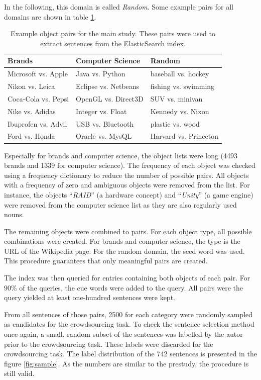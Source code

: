 In the following, this domain is called \emph{Random}. Some example pairs for all domains are shown in table \ref{tbl:exp_pairs}.
\begin{table}[h]
\centering
\caption{Example object pairs for the main study. These pairs were used to extract sentences from the ElasticSearch index.}
\label{tbl:exp_pairs}

\begin{tabularx}{\textwidth}{XXX}
\toprule
Brands & Computer Science & Random \\
\midrule
Microsoft vs. Apple & Java vs. Python & baseball vs. hockey \\
Nikon vs. Leica & Eclipse vs. Netbeans & fishing vs. swimming\\
Coca-Cola vs. Pepsi & OpenGL vs. Direct3D & SUV vs. minivan\\
Nike vs. Adidas & Integer vs. Float & Kennedy vs. Nixon\\
Ibuprofen vs. Advil & USB vs. Bluetooth & plastic vs. wood\\
Ford vs. Honda & Oracle vs. MysQL & Harvard vs. Princeton\\

\bottomrule

\end{tabularx}

\end{table}

Especially for brands and computer science, the object lists were long (4493 brands and 1339 for computer science). The frequency of each object was checked using a frequency dictionary to reduce the number of possible pairs. All objects with a frequency of zero and ambiguous objects were removed from the list. For instance, the objects \enquote{\emph{RAID}} (a hardware concept) and \enquote{\emph{Unity}}  (a game engine) were removed from the computer science list as they are also regularly used nouns.

The remaining objects were combined to pairs. For each object type, all possible combinations were created. For brands and computer science, the type is the URL of the Wikipedia page. For the random domain, the seed word was used. This procedure guarantees that only meaningful pairs are created.

The index was then queried for entries containing both objects of each pair. For 90\% of the queries, the cue words were added to the query. All pairs were the query yielded at least one-hundred sentences were kept.

From all sentences of those pairs, 2500 for each category were randomly sampled as candidates for the crowdsourcing task. To check the sentence selection method once again, a small, random subset of the sentences was labelled by the autor prior to the crowdsourcing task. These labels were discarded for the crowdsourcing task.
The label distribution of the 742 sentences is presented in the figure \ref{fig:sample}. As the numbers are similar to the prestudy, the procedure is still valid.


